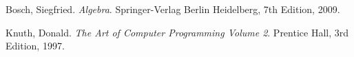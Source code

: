 \documentclass[refman]{scrartcl}
\begin{document}
\begin{thebibliography}{9}
	Bosch, Siegfried. 
	\textit{Algebra}. 
	Springer-Verlag Berlin Heidelberg, 7th Edition, 2009.
	
	Knuth, Donald. 
	\textit{The Art of Computer Programming Volume 2}. 
	Prentice Hall, 3rd Edition, 1997.
	
\end{thebibliography}
\end{document}
